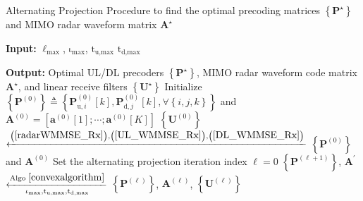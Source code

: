 \documentclass[9pt,journal]{IEEEtran}
\newcommand{\paren}[1]{\left({#1}\right)}
\newcommand{\bracket}[1]{{\left [{#1}\right ]}}
\newcommand{\braces}[1]{{\left\{ {#1}\right\}}}
\newcommand{\rr}{_\mathrm{r}}
\newcommand{\B}{\textrm{B}}
\newcommand{\rnr}{_{\mathrm{r},n_\mathrm{r}}}
\newcommand{\HrB}{\mathbf{H}_{\textrm{rB}}}
\newcommand{\Hrj}{\mathbf{H}_{\textrm{r},j}}
\newcommand{\HBj}{\mathbf{H}_{\textrm{B},j}}
\newcommand{\HiB}{\mathbf{H}_{i,\textrm{B}}}
\begin{document}
	\begin{algorithm}[ht!]
		\caption{Alternating Projection Procedure to find the optimal precoding matrices $\braces{\mathbf{P}^\star}$ and MIMO radar waveform matrix $\mathbf{A}^\star$}
		\label{Alternating_sum}
		\begin{algorithmic}[1]
			\Statex \textbf{Input:} $\mathrm{\ell}_{\textrm{max}}$, $\mathrm{\iota}_{\textrm{max}}$, $\mathrm{t}_{\textrm{u,max}}$ $\mathrm{t}_{\textrm{d,max}}$
			
			\Statex \textbf{Output:} Optimal UL/DL precoders $\braces{\mathbf{P}^\star}$, MIMO radar waveform code matrix $\mathbf{A}^\star$, and linear receive filters $\braces{\mathbf{U}^\star}$
			\State Initialize $\braces{\mathbf{P}^{\paren{\mathrm{0}}}}\triangleq
			\braces{\mathbf{P}^{\paren{\mathrm{0}}}_{\textrm{u},i}\bracket{k},\mathbf{P}^{\paren{\mathrm{0}}}_{\textrm{d},j}\bracket{k}, \forall \braces{i,j,k}}$ and $\mathbf{A}^{\paren{\mathrm{0}}}=\bracket{\mathbf{a}^{\paren{\mathrm{0}}}\bracket{1};\cdots;\mathbf{a}^{\paren{\mathrm{0}}}\bracket{\mathrm{\mathit{K}}}}$
			\State %
			$\braces{\mathbf{U}^{\paren{\mathrm{0}}}}$ $\xleftarrow{\mathrm{\paren{\ref{radarWMMSE_Rx}}},\mathrm{\paren{\ref{UL_WMMSE_Rx}}},\mathrm{\paren{\ref{DL_WMMSE_Rx}}}}$  $\braces{\mathbf{P}^{\paren{\mathrm{0}}}}$ and $\mathbf{A}^{\paren{\mathrm{0}}}$ 
			\State Set the alternating projection iteration index $\mathrm{\ell=0}$
			\Repeat \; 
			\State $\braces{\mathbf{P}^{\paren{\mathrm{\ell+1}}}}$, $\mathbf{A}^\prime$ $\xleftarrow[\mathrm{\iota}_{\textrm{max}},\mathrm{t}_{\textrm{u,max}},\mathrm{t}_{\textrm{d,max}}]{\textrm{Algo }\ref{convexalgorithm}}$ $\braces{\mathbf{P}^{\paren{\mathrm{\ell}}}}$, $\mathbf{A}^{\paren{\mathrm{\ell}}}$, $\braces{\mathbf{U}^{\paren{\mathrm{\ell}}}}$  %

\end{algorithmic}
\end{algorithm}
\end{document}
